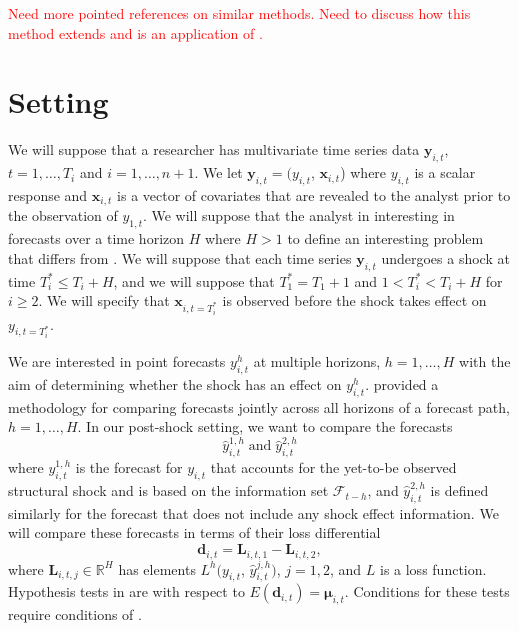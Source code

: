 \documentclass[11pt]{article}
\newcommand{\R}{\mathbb{R}}
\newcommand{\x}{\textbf{x}}
\newcommand{\dbf}{\textbf{d}}
\newcommand{\y}{\textbf{y}}
\newcommand{\Llet}{\textbf{L}}
\def\mbf#1{\mathbf{#1}} %
\theoremstyle{definition}
\begin{document}
\vspace*{0.5cm}\noindent\textcolor{red}{Need more pointed references on similar methods. Need to discuss how this method extends \cite{lin2021minimizing} and is an application of \cite{quaedvlieg2021multi}.}



\section{Setting}

\label{section2}

We will suppose that a researcher has multivariate time series data $\y_{i,t}$, $t = 1, \ldots,  T_i$ and $i = 1, \ldots, n+1$. We let $\y_{i,t} = (y_{i,t}$, $\x_{i,t}$) where $y_{i,t}$ is a scalar response and $\x_{i,t}$ is a vector of covariates that are revealed to the analyst prior to the observation of $y_{1,t}$.  We will suppose that the analyst in interesting in forecasts over a time horizon $H$ where $H > 1$ to define an interesting problem that differs from \cite{lin2021minimizing}.
We will suppose that each time series $\y_{i,t}$ undergoes a shock at time $T^*_i \leq T_i + H$, and we will suppose that $T^*_1 = T_1 + 1$ and $1 < T^*_i < T_i + H$ for $i \geq 2$. 
We will specify that $\x_{i,t=T^*_i}$ is observed before the shock takes effect on $y_{i,t=T^*_i}$.

We are interested in point forecasts $y_{i,t}^h$ at multiple horizons, $h = 1, \ldots, H$ with the aim of determining whether the shock has an effect on $y_{i,t}^h$.
\cite{quaedvlieg2021multi} provided a methodology for comparing forecasts jointly across all horizons of a forecast path, $h = 1,\ldots, H$. In our post-shock setting, we want to compare the forecasts 
$$
  \hat y^{1,h}_{i,t} \; \text{and} \; \hat y^{2,h}_{i,t}
$$
where $y^{1,h}_{i,t}$ is the forecast for $y_{i,t}$ that accounts for the yet-to-be observed structural shock and is based on the information set $\mathcal{F}_{t-h}$, and $\hat y^{2,h}_{i,t}$ is defined similarly for the forecast that does not include any shock effect information. We will compare these forecasts in terms of their loss differential
$$
  \dbf_{i,t} = \Llet_{i,t,1} - \Llet_{i,t,2},
$$
where $\Llet_{i,t,j} \in \R^H$ has elements $L^h(y_{i,t}$, $\hat y_{i,t}^{j,h})$, $j = 1,2$, and $L$ is a loss function. Hypothesis tests in \cite{quaedvlieg2021multi} are with respect to $E(\dbf_{i,t}) = \mbf\mu_{i,t}$. Conditions for these tests require conditions of \cite{giacomini2006tests}. 
\end{document}
